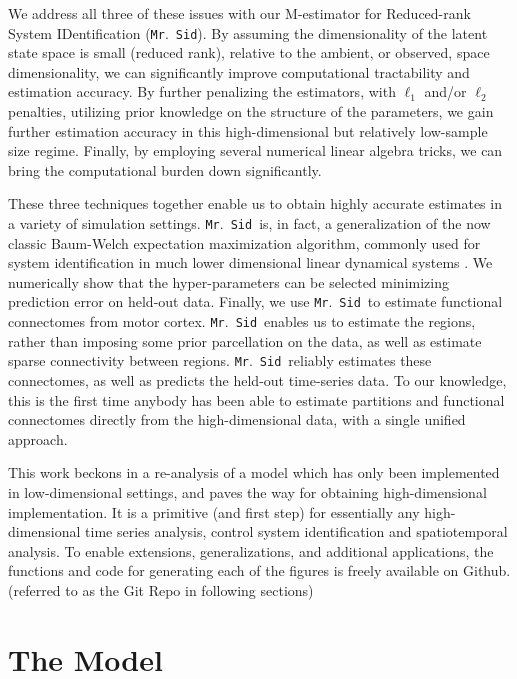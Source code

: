 \documentclass[fleqn,12pt]{article}
\newcommand{\mrsid}{{\sc \texttt{Mr}.~\texttt{Sid}}}
\begin{document}
We address all three of these issues with our M-estimator for Reduced-rank  System IDentification (\mrsid).  By assuming the dimensionality of the latent state space is small (reduced rank), relative to the ambient, or observed, space dimensionality, we can significantly improve computational tractability and estimation accuracy. By further penalizing the estimators, with $\ell_1$ and/or $\ell_2$ penalties, utilizing prior knowledge on the structure of the parameters, we gain further estimation accuracy in this high-dimensional but relatively low-sample size regime.  Finally, by employing several numerical linear algebra tricks, we can bring the computational burden down significantly.

These three techniques together enable us to obtain highly accurate estimates in a variety of simulation settings.  \mrsid~is, in fact, a generalization of the now classic Baum-Welch expectation maximization algorithm, commonly used for system identification in much lower dimensional linear dynamical systems \citep{rabiner1989tutorial}. We numerically show that the hyper-parameters can be selected minimizing prediction error on held-out data.  Finally, we use \mrsid~to estimate functional connectomes from motor cortex.  \mrsid~enables us to estimate the regions, rather than imposing some prior parcellation on the data, as well as estimate sparse connectivity between regions.  \mrsid~reliably estimates these connectomes, as well as predicts the held-out time-series data.  To our knowledge, this is the first time anybody has been able to estimate partitions and functional connectomes directly from the high-dimensional data, with a single unified approach.

This work beckons in a re-analysis of a model which has only been implemented in low-dimensional settings,
and paves the way for obtaining high-dimensional implementation. It is a primitive (and first step) for essentially any high-dimensional time series analysis, control system identification and spatiotemporal analysis. To enable extensions, generalizations, and additional applications, the functions and code for generating each of the figures is freely available on Github. (referred to as the Git Repo in following sections) %



\section{The Model}
\end{document}
